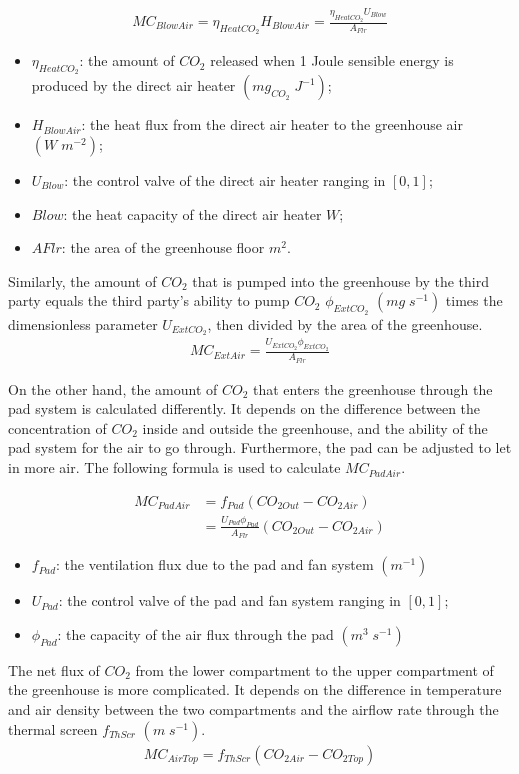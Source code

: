 \documentclass[a4paper]{article}
\numberwithin{equation}{section}
\begin{document}
\begin{gather}
  MC_{BlowAir} ={\eta_{HeatCO_2}}H_{BlowAir} =\frac{\eta_{HeatCO_2}U_{Blow}}{A_{Flr}}
\end{gather}
\begin{itemize}
  \item \({\eta_{HeatCO_2}}\): the amount of \(CO_2\) released when 1 Joule sensible energy is produced by the direct air heater \((mg_{CO_2}\;J^{-1})\);	
  \item \(H_{BlowAir}\): the heat flux from the direct air heater to the greenhouse air  \((W\;m^{-2})\);
  \item\(U_{Blow}\): the control valve of the direct air heater ranging in \([0,1]\);
    \item\(Blow\): the heat capacity of the direct air heater \(W\);
    \item \(AFlr\): the area of the greenhouse floor \(m^2\).
\end{itemize}

Similarly, the amount of \(CO_2\) that is pumped into the greenhouse by the third party equals the third party's ability to pump \(CO_2\) \(\phi_{ExtCO_2}\) \((mg\;s^{-1})\) times the dimensionless parameter \(U_{ExtCO_2}\), then divided by the area of the greenhouse.
\begin{gather}
  MC_{ExtAir} = \frac{U_{ExtCO_2}\phi_{ExtCO_2}}{A_{Flr}}
\end{gather}

On the other hand, the amount of \(CO_2\) that enters the greenhouse through the pad system is calculated differently.
It depends on the difference between the concentration of \(CO_2\) inside and outside the greenhouse, and the ability of the pad system for the air to go through. Furthermore, the pad can be adjusted to let in more air. The following formula is used to calculate \( MC_{PadAir}\).

\begin{equation}
  \begin{split}
    MC_{PadAir} & = f_{Pad} (CO_{2 Out} - CO_{2 Air}) \\
    & = \frac{U_{Pad} \phi_{Pad}}{A_{Flr}} (CO_{2 Out} - CO_{2 Air})
  \end{split}
\end{equation}
\begin{itemize}
  \item \(f_{Pad}\): the ventilation flux due to the pad and fan system \((m^{-1})\)
  \item \(U_{Pad}\): the control valve of the pad and fan system ranging in \([0,1]\);
  \item \(\phi_{Pad}\): the capacity of the air flux through the pad \((m^3\;s^{-1})\) 

\end{itemize}
The net flux of \(CO_2\) from the lower compartment to the upper compartment of the greenhouse is more complicated.
It depends on the difference in temperature and air density between the two compartments and the airflow rate through the thermal screen \(f_{ThScr}\) \((m\;s^{-1})\).
\begin{gather}
  MC_{AirTop} = f_{ThScr} (CO_{2 Air} - CO_{2 Top})
\end{gather}
\end{document}
